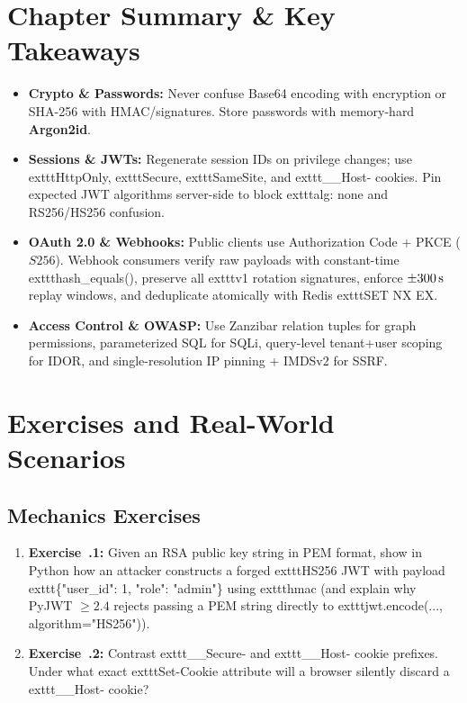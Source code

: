 \section{Chapter Summary \protect\& Key Takeaways}

\begin{itemize}[leftmargin=15pt]
  \item \textbf{Crypto \& Passwords:} Never confuse Base64 encoding with encryption or SHA-256 with HMAC/signatures. Store passwords with memory-hard \textbf{Argon2id}.
  \item \textbf{Sessions \& JWTs:} Regenerate session IDs on privilege changes; use 	exttt{HttpOnly}, 	exttt{Secure}, 	exttt{SameSite}, and 	exttt{\_\_Host-} cookies. Pin expected JWT algorithms server-side to block 	exttt{alg: none} and RS256/HS256 confusion.
  \item \textbf{OAuth 2.0 \& Webhooks:} Public clients use Authorization Code + PKCE ($S256$). Webhook consumers verify raw payloads with constant-time 	exttt{hash\_equals()}, preserve all 	exttt{v1} rotation signatures, enforce $\pm 300\text{\,s}$ replay windows, and deduplicate atomically with Redis 	exttt{SET NX EX}.
  \item \textbf{Access Control \& OWASP:} Use Zanzibar relation tuples for graph permissions, parameterized SQL for SQLi, query-level tenant+user scoping for IDOR, and single-resolution IP pinning + IMDSv2 for SSRF.
\end{itemize}

\section{Exercises and Real-World Scenarios}

\subsection{Mechanics Exercises}
\begin{enumerate}[leftmargin=15pt]
  \item \textbf{Exercise~\thechapter.1:} Given an RSA public key string in PEM format, show in Python how an attacker constructs a forged 	exttt{HS256} JWT with payload 	exttt{\{"user\_id": 1, "role": "admin"\}} using 	exttt{hmac} (and explain why PyJWT $\ge 2.4$ rejects passing a PEM string directly to 	exttt{jwt.encode(..., algorithm="HS256")}).
  \item \textbf{Exercise~\thechapter.2:} Contrast 	exttt{\_\_Secure-} and 	exttt{\_\_Host-} cookie prefixes. Under what exact 	exttt{Set-Cookie} attribute will a browser silently discard a 	exttt{\_\_Host-} cookie?
\end{enumerate}

